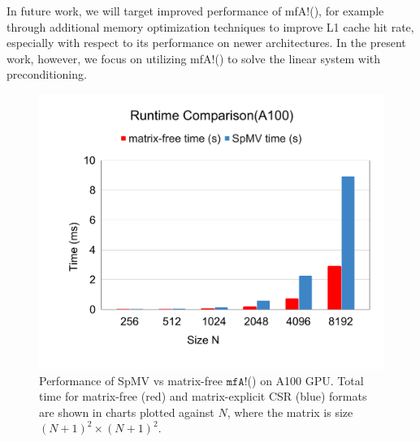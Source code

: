 In future work, we will target improved performance of {\ttfamily mfA!}(), for example through additional memory optimization techniques to improve L1 cache hit rate, especially with respect to its performance on newer architectures. In the present work, however, we focus on utilizing {\ttfamily mfA!}() to solve the linear system with preconditioning.



\begin{figure}
    \centering
    \includegraphics[width=\linewidth]{figures/Runtime_Comparison_A100.pdf}
    \caption{Performance of SpMV vs matrix-free $\texttt{mfA!}$() on A100 GPU. Total time for matrix-free (red) and matrix-explicit CSR (blue) formats are shown in charts plotted against $N$, where the matrix is size $(N+1)^2 \times (N+1)^2$.}
    \label{fig:A100}
\end{figure}

